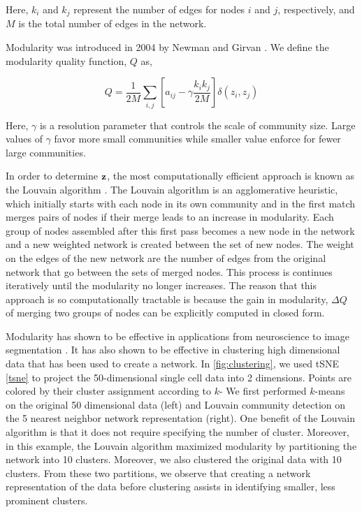 Here, $k_{i}$ and $k_{j}$ represent the number of edges for nodes $i$ and $j$, respectively, and $M$ is the total number of edges in the network. 

\indent Modularity was introduced in 2004 by Newman and Girvan \cite{newmangirvan}. We define the modularity quality function, $Q$ as,

\begin{equation}
Q=\frac{1}{2M}\sum_{i,j}\left[a_{ij}-\gamma \frac{k_{i}k_{j}}{2M}\right]\delta(z_{i},z_{j})
\end{equation} 

Here, $\gamma$ is a resolution parameter \cite{resParam} that controls the scale of community size. Large values of $\gamma$ favor more small communities while smaller value enforce for fewer large communities. 

\indent In order to determine ${\bf z}$, the most computationally efficient approach is known as the Louvain algorithm \cite{blondel}. The Louvain algorithm is an agglomerative heuristic, which initially starts with each node in its own community and in the first match merges pairs of nodes if their merge leads to an increase in modularity. Each group of nodes assembled after this first pass becomes a new node in the network and a new weighted network is created between the set of new nodes. The weight on the edges of the new network are the number of edges from the original network that go between the sets of merged nodes. This process is continues iteratively until the modularity no longer increases. The reason that this approach is so computationally tractable is because the gain in modularity, $\Delta Q$ of merging two groups of nodes can be explicitly computed in closed form.

\indent Modularity has shown to be effective in applications from neuroscience \cite{hierarchicalmod} to image segmentation \cite{browet}. It has also shown to be effective in clustering high dimensional data that has been used to create a network. In \ref{fig:clustering}, we used tSNE \ref{tsne} to project the 50-dimensional single cell data into 2 dimensions. Points are colored by their cluster assignment according to $k$- We first performed $k$-means on the original 50 dimensional data (left) and Louvain community detection on the 5 nearest neighbor network representation (right). One benefit of the Louvain algorithm is that it does not require specifying the number of cluster. Moreover, in this example, the Louvain algorithm maximized modularity by partitioning the network into 10 clusters. Moreover, we also clustered the original data with 10 clusters. From these two partitions, we observe that creating a network representation of the data before clustering assists in identifying smaller, less prominent clusters.


